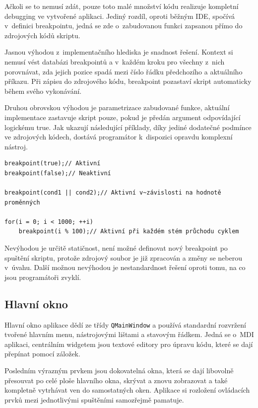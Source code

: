 \documentclass[11pt,twoside,a4paper]{book}
\begin{document}
Ačkoli se to nemusí zdát, pouze toto malé množství kódu realizuje kompletní debugging ve vytvořené aplikaci. Jediný rozdíl, oproti běžným IDE, spočívá v~definici breakpointu, jedná se zde o~zabudovanou funkci zapsanou přímo do zdrojových kódů skriptu.

Jasnou výhodou z~implementačního hlediska je snadnost řešení. Kontext si nemusí vést databázi breakpointů a v~každém kroku pro všechny z~nich porovnávat, zda jejich pozice spadá mezi číslo řádku předchozího a aktuálního příkazu. Při zápisu do zdrojového kódu, breakpoint pozastaví skript automaticky během svého vykonávání.

Druhou obrovskou výhodou je parametrizace zabudované funkce, aktuální implementace zastavuje skript pouze, pokud je předán argument odpovídající logickému true. Jak ukazují následující příklady, díky jediné dodatečné podmínce ve zdrojových kódech, dostává programátor k~dispozici opravdu komplexní nástroj.

\begin{verbatim}
breakpoint(true);// Aktivní
breakpoint(false);// Neaktivní

breakpoint(cond1 || cond2);// Aktivní v~závislosti na hodnotě proměnných

for(i = 0; i < 1000; ++i)
    breakpoint(i % 100);// Aktivní při každém stém průchodu cyklem
\end{verbatim}

Nevýhodou je určitě statičnost, není možné definovat nový breakpoint po spuštění skriptu, protože zdrojový soubor je již zpracován a změny se neberou v~úvahu. Další možnou ne\-vý\-ho\-dou je nestandardnost řešení oproti tomu, na co jsou programátoři zvyklí.


\subsection{Hlavní okno}

Hlavní okno aplikace dědí ze třídy \texttt{QMainWindow} a používá standardní rozvržení tvořené hlavním menu, nástrojovými lištami a stavovým řádkem. Jedná se o~MDI aplikaci, centrálním widgetem jsou textové editory pro úpravu kódu, které se dají přepínat pomocí záložek.

Posledním výrazným prvkem jsou dokovatelná okna, která se dají libovolně přesouvat po celé ploše hlavního okna, skrývat a znovu zobrazovat a také kompletně vytrhávat ven do samostatných oken. Aplikace si rozložení ovládacích prvků mezi jednotlivými spuštěními samozřejmě pamatuje.
\end{document}
